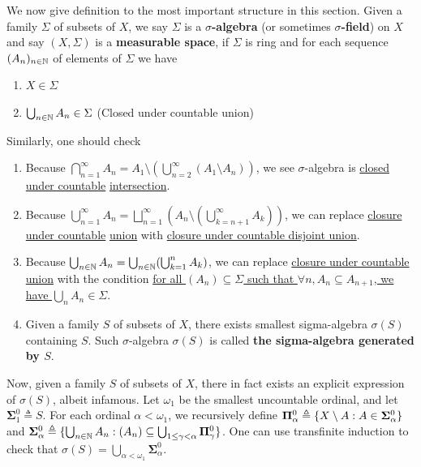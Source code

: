 \documentclass{report}
\begin{document}
\begin{mdframed}
We now give definition to the most important structure in this section. Given a family $\Sigma$ of subsets of $X$,  we say $\Sigma$ is a \textbf{$\sigma$-algebra} (or sometimes \textbf{$\sigma$-field}) on $X$ and say $(X,\Sigma)$ is a \textbf{measurable space}, if $\Sigma$ is ring and for each sequence $(A_n)_{n\in\mathbb{N}}$ of elements of $\Sigma$ we have
\begin{enumerate}[label=(\alph*)]
  \item $X \in \Sigma$
  \item  $\bigcup_{n\in\mathbb{N}} A_n \in \Sigma$ (Closed under countable union)
\end{enumerate}
Similarly, one should check 
\begin{enumerate}[label=(\alph*)]
\label{pop_sig}
\item Because $\bigcap_{n=1}^{\infty}A_n = A_1 \setminus (\bigcup_{n=2}^{\infty}(A_1\setminus A_n))$, we see  $\sigma$-algebra is \underline{closed under countable} \underline{intersection}. 
\item Because $\bigcup_{n=1}^{\infty}A_n = \bigsqcup_{n=1}^{\infty} (A_n \setminus (\bigcup_{k=n+1}^{\infty} A_k))$, we can replace \underline{closure under countable} \underline{union} with \underline{closure under countable disjoint union}.  
\item Because $\bigcup_{n\in\mathbb{N}}A_n = \bigcup_{n\in\mathbb{N}} (\bigcup_{k=1}^n A_k)$, we can replace \underline{closure under countable union} with the condition \underline{for all  $(A_n)\subseteq \Sigma$ such that $\forall n,A_n \subseteq A_{n+1}$, we have $\bigcup_n A_n \in \Sigma$}.
\item Given a family $S$ of subsets of $X$, there exists smallest sigma-algebra $\sigma(S)$ containing $S$. Such $\sigma$-algebra $\sigma(S)$ is called \textbf{the sigma-algebra generated by $S$}.
\end{enumerate}
\label{consig}
Now, given a family $S$ of subsets of $X$, there in fact exists an explicit expression of $\sigma (S)$, albeit infamous. Let $\omega_1$ be the smallest uncountable ordinal, and let $\mathbf{\Sigma}^0_1\triangleq S$. For each ordinal $\alpha <\omega_1$, we recursively define $\mathbf{\Pi}^0_\alpha \triangleq  \{ X\setminus A: A \in \mathbf{\Sigma}^0_\alpha \}$ and $\mathbf{\Sigma}^0_\alpha \triangleq \{ \bigcup_{n\in\mathbb{N}}A_n: (A_n)\subseteq \bigcup_{1\leq \gamma <\alpha }\mathbf{\Pi}^0_\gamma  \}$. One can use transfinite induction to check that $\sigma (S)= \bigcup_{\alpha <\omega_1}\mathbf{\Sigma}^0_\alpha$.
\end{mdframed}
\end{document}
